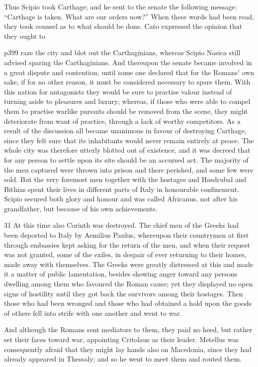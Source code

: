 Thus Scipio took Carthage; and he sent to the senate the following message: ``Carthage is taken. What are our orders now?'' When these words had been read, they took counsel as to what should be done. Cato expressed the opinion that they ought to

p399 raze the city and blot out the Carthaginians, whereas Scipio Nasica still advised sparing the Carthaginians. And thereupon the senate became involved in a great dispute and contention, until some one declared that for the Romans' own sake, if for no other reason, it must be considered necessary to spare them. With this nation for antagonists they would be sure to practise valour instead of turning aside to pleasures and luxury; whereas, if those who were able to compel them to practise warlike pursuits should be removed from the scene, they might deteriorate from want of practice, through a lack of worthy competitors. As a result of the discussion all became unanimous in favour of destroying Carthage, since they felt sure that its inhabitants would never remain entirely at peace. The whole city was therefore utterly blotted out of existence, and it was decreed that for any person to settle upon its site should be an accursed act. The majority of the men captured were thrown into prison and there perished, and some few were sold. But the very foremost men together with the hostages and Hasdrubal and Bithias spent their lives in different parts of Italy in honourable confinement. Scipio secured both glory and honour and was called Africanus, not after his grandfather, but because of his own achievements.

31
At this time also Corinth was destroyed. The chief men of the Greeks had been deported to Italy by Aemilius Paulus, whereupon their countrymen at first through embassies kept asking for the return of the men, and when their request was not granted, some of the exiles, in despair of ever returning to their homes, made away with themselves. The Greeks were greatly distressed at this and made it a matter of public lamentation, besides showing anger toward any persons dwelling among them who favoured the Roman cause; yet they displayed no open signs of hostility until they got back the survivors among their hostages. Then those who had been wronged and those who had obtained a hold upon the goods of others fell into strife with one another and went to war.

And although the Romans sent mediators to them, they paid no heed, but rather set their faces toward war, appointing Critolaus as their leader. Metellus was consequently afraid that they might lay hands also on Macedonia, since they had already appeared in Thessaly; and so he went to meet them and routed them.

